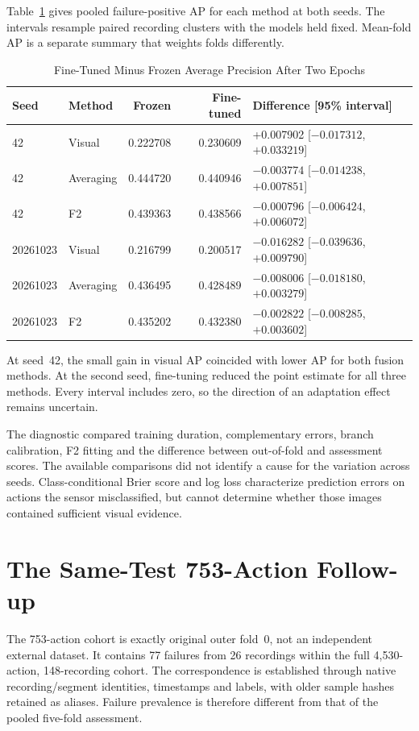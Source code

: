 Table~\ref{tab:twoepoch-supplement} gives pooled failure-positive AP for each method at
both seeds. The intervals resample paired recording clusters with the models held fixed.
Mean-fold AP is a separate summary that weights folds differently.

\begin{table}[htbp]
\caption{Fine-Tuned Minus Frozen Average Precision After Two Epochs}\label{tab:twoepoch-supplement}
\centering\small

\begin{tabular}{llrrl}\toprule
Seed & Method & Frozen & Fine-tuned & Difference [95\% interval]\\\midrule
42 & Visual &0.222708&0.230609&+0.007902 [$-0.017312$, $+0.033219$]\\
42 & Averaging &0.444720&0.440946&$-0.003774$ [$-0.014238$, $+0.007851$]\\
42 & F2 &0.439363&0.438566&$-0.000796$ [$-0.006424$, $+0.006072$]\\
20261023 & Visual &0.216799&0.200517&$-0.016282$ [$-0.039636$, $+0.009790$]\\
20261023 & Averaging &0.436495&0.428489&$-0.008006$ [$-0.018180$, $+0.003279$]\\
20261023 & F2 &0.435202&0.432380&$-0.002822$ [$-0.008285$, $+0.003602$]\\\bottomrule
\end{tabular}
\end{table}

At seed~42, the small gain in visual AP coincided with lower AP for both fusion methods.
At the second seed, fine-tuning reduced the point estimate for all three methods. Every
interval includes zero, so the direction of an adaptation effect remains uncertain.

The diagnostic compared training duration, complementary errors, branch calibration, F2
fitting and the difference between out-of-fold and assessment scores. The available
comparisons did not identify a cause for the variation across seeds. Class-conditional
Brier score and log loss characterize prediction errors on actions the sensor
misclassified, but cannot determine whether those images contained sufficient visual
evidence.

\section{The Same-Test 753-Action Follow-up}
The 753-action cohort is exactly original outer fold~0, not an independent external
dataset. It contains 77 failures from 26 recordings within the full 4,530-action,
148-recording cohort. The correspondence is established through native recording/segment
identities, timestamps and labels, with older sample hashes retained as aliases. Failure
prevalence is therefore different from that of the pooled five-fold assessment.

